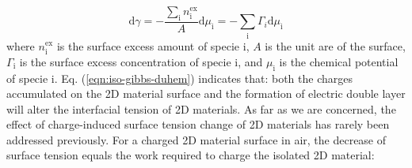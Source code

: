 \documentclass[journal=ancac3,manuscript=article,email=true]{achemso}
\begin{document}
\begin{equation}
\label{eqn:iso-gibbs-duhem}
\displaystyle
\mathrm{d}\gamma = -\frac{\sum_{\mathrm{i}} n_{\mathrm{i}}^{\mathrm{ex}}}{A} \mathrm{d} \mu_{\mathrm{i}} 
                 = -\sum_{\mathrm{i}} \Gamma_{i} \mathrm{d} \mu_{\mathrm{i}}
\end{equation}
where \(n_{\mathrm{i}}^{\mathrm{ex}}\) is the surface excess amount of
specie i, \(A\) is the unit are of the surface, \(\Gamma_{\mathrm{i}}\) is
the surface excess concentration of specie i, and \(\mu_{\mathrm{i}}\)
is the chemical potential of specie i. Eq. (\ref{eqn:iso-gibbs-duhem})
indicates that: both the charges accumulated on the 2D material
surface and the formation of electric double layer will alter the
interfacial tension of 2D materials. As far as we are concerned, the
effect of charge-induced surface tension change of 2D materials has
rarely been addressed previously. For a charged 2D material surface in
air, the decrease of surface tension equals the work required to
charge the isolated 2D material:
\end{document}
